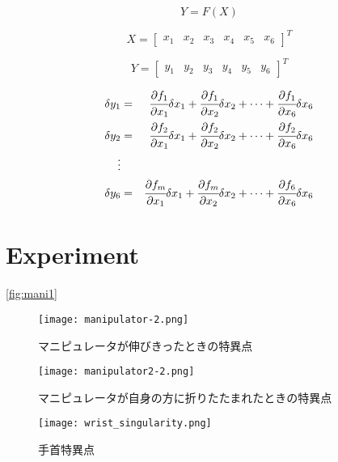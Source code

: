 \documentclass [titlepage, a4j, 11pt] {jsarticle}
\begin{document}
\begin{equation}
Y=F(X)
\end{equation}

\begin{equation}
X=
	\begin{bmatrix}
	x_1 &x_2 &x_3 &x_4 &x_5 &x_6
	\end{bmatrix}
^T
\end{equation}

\begin{equation}
Y=
	\begin{bmatrix}
	y_1 &y_2 &y_3 &y_4 &y_5 &y_6
	\end{bmatrix}
^T
\end{equation}

\begin{eqnarray}
\delta y_1&=&\cfrac{\partial f_1}{\partial x_1}\delta x_1+\cfrac{\partial f_1}{\partial x_2}\delta x_2+\cdots+
				\cfrac{\partial f_1}{\partial x_6}\delta x_6 \nonumber \\
\delta y_2&=&\cfrac{\partial f_2}{\partial x_1}\delta x_1+\cfrac{\partial f_2}{\partial x_2}\delta x_2+\cdots+
				\cfrac{\partial f_2}{\partial x_6}\delta x_6 \nonumber \\
\vdots \\
\delta y_6&=&\cfrac{\partial f_m}{\partial x_1}\delta x_1+\cfrac{\partial f_m}{\partial x_2}\delta x_2+\cdots+
				\cfrac{\partial f_6}{\partial x_6}\delta x_6 \nonumber
\end{eqnarray}

\newpage
\section{Experiment}
\ref{fig:mani1}
\begin{figure}[H]
\begin{minipage}{0.5 \hsize}
	\begin{center}
		\texttt{[image: manipulator-2.png]} %
		\caption{マニピュレータが伸びきったときの特異点}
		\label{fig:mani1}
	\end{center}
\end{minipage}
\begin{minipage}{0.5 \hsize}
	\begin{center}
		\texttt{[image: manipulator2-2.png]} %
		\caption{マニピュレータが自身の方に折りたたまれたときの特異点}
		\label{fig:mani2}
	\end{center}
\end{minipage}
\end{figure}

\begin{figure}[H]
	\begin{center}
		\texttt{[image: wrist\_singularity.png]} %
		\caption{手首特異点}
		\label{fig:sin3}
	\end{center}
\end{figure}
\end{document}
